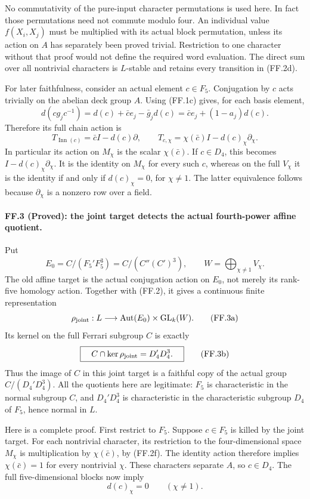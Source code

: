 No commutativity of the pure-input character permutations is
used here. In fact those permutations need not commute modulo
four. An individual value $f(X_i,X_j)$ must be multiplied with
its actual block permutation, unless its action on $A$ has
separately been proved trivial. Restriction to one character
without that proof would not define the required word
evaluation. The direct sum over all nontrivial characters is
$L$-stable and retains every transition in (FF.2d).

For later faithfulness, consider an actual element $c\in F_5$.
Conjugation by $c$ acts trivially on the abelian deck group $A$.
Using (FF.1c) gives, for each basis element,
\[
 d(cg_jc^{-1})
 =d(c)+\bar c e_j-\bar g_jd(c)
 =\bar c e_j+(1-a_j)d(c).
\]
Therefore its full chain action is
\[
 \boxed{\quad T_{\operatorname{Inn}(c)}
          =\bar c I-d(c)\partial,\qquad
 T_{c,\chi}=\chi(\bar c)I-d(c)_\chi\partial_\chi.\quad}
 \tag{FF.2f}
\]
In particular its action on $M_\chi$ is the scalar
$\chi(\bar c)$. If $c\in D_4$, this becomes
$I-d(c)_\chi\partial_\chi$. It is the identity on
$M_\chi$ for every such $c$, whereas on the full $V_\chi$
it is the identity if and only if $d(c)_\chi=0$, for
$\chi\ne1$. The latter equivalence follows because
$\partial_\chi$ is a nonzero row over a field.

\paragraph{FF.3 (Proved): the joint target detects the actual fourth-power affine quotient.}
Put
\[
 E_0=C/(F_5'F_5^3)=C/(C''(C')^3),\qquad
 W=\bigoplus_{\chi\ne1}V_\chi.
\]
The old affine target is the actual conjugation action on
$E_0$, not merely its rank-five homology action. Together
with (FF.2), it gives a continuous finite representation
\[
 \rho_{\rm joint}:L\longrightarrow
       \operatorname{Aut}(E_0)\times\operatorname{GL}_k(W).
 \tag{FF.3a}
\]
Its kernel on the full Ferrari subgroup $C$ is exactly
\[
 \boxed{\quad C\cap\ker\rho_{\rm joint}=D_4'D_4^3.\quad}
 \tag{FF.3b}
\]
Thus the image of $C$ in this joint target is a faithful copy
of the actual group $C/(D_4'D_4^3)$.
All the quotients here are legitimate: $F_5$ is characteristic
in the normal subgroup $C$, and $D_4'D_4^3$ is characteristic
in the characteristic subgroup $D_4$ of $F_5$, hence normal
in $L$.

Here is a complete proof. First restrict to $F_5$. Suppose
$c\in F_5$ is killed by the
joint target. For each nontrivial character, its restriction
to the four-dimensional space $M_\chi$ is multiplication
by $\chi(\bar c)$, by (FF.2f). The identity action therefore
implies $\chi(\bar c)=1$ for every nontrivial $\chi$.
These characters separate $A$, so $c\in D_4$.
The full five-dimensional blocks now imply
\[
                         d(c)_\chi=0\qquad(\chi\ne1).
 \tag{FF.3c}
\]

